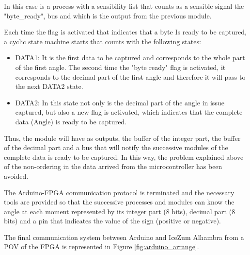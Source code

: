 In this case is a process with a sensibility list that counts as a sensible signal the "byte\_ready", bus and which is the output from the previous module. \newline

Each time the flag is activated that indicates that a byte Is ready to be captured, a cyclic state machine starts that counts with the following states:

\begin{itemize}
	\item DATA1: It is the first data to be captured and corresponds to the whole part of the first angle. The second time the "byte ready" flag is activated, it corresponds to the decimal part of the first angle and therefore it will pass to the next DATA2 state.
	\item DATA2: In this state not only is the decimal part of the angle in issue captured, but also a new flag is activated, which indicates that the complete data (Angle) is ready to be captured.
\end{itemize}

Thus, the module will have as outputs, the buffer of the integer part, the buffer of the decimal part and a bus that will notify the successive modules of the complete data is ready to be captured. In this way, the problem explained above of the non-ordering in the data arrived from the microcontroller has been avoided. \newline

The Arduino-FPGA communication protocol is terminated and the necessary tools are provided so that the successive processes and modules can know the angle at each moment represented by its integer part (8 bits), decimal part (8 bits) and a pin that indicates the value of the sign (positive or negative).

The final communication system between Arduino and IceZum Alhambra from a POV of the FPGA is represented in Figure \ref{fig:arduino_arrange}.

